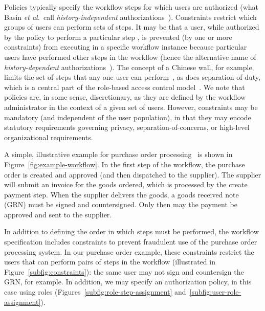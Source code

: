 \documentclass[jcs,crcready]{iosart1c}
\newcommand{\etal}{\textit{et al.}\xspace}
\begin{document}
Policies typically specify the workflow steps for which users are authorized (what Basin \etal\ call \emph{history-independent} authorizations~\cite{BaBuKa12}).
Constraints restrict which groups of users can perform sets of steps.
It may be that a user, while authorized by the policy to perform a particular step , is prevented (by one or more constraints) from executing  in a specific workflow instance because particular users have performed other steps in the workflow (hence the alternative name of \emph{history-dependent} authorizations~\cite{BaBuKa12}).
The concept of a Chinese wall, for example, limits the set of steps that any one user can perform~\cite{BrNa89}, as does separation-of-duty, which is a central part of the role-based access control model~\cite{ansi-rbac04}.
We note that policies are, in some sense, discretionary, as they are defined by the workflow administrator in the context of a given set of users.
However, constraints may be mandatory (and independent of the user population), in that they may encode statutory requirements governing privacy, separation-of-concerns, or high-level organizational requirements.


A simple, illustrative example for purchase order processing~\cite{CrGu13} is shown in Figure~\ref{fig:example-workflow}.
In the first step of the workflow, the purchase order is created and approved (and then dispatched to the supplier).
The supplier will submit an invoice for the goods ordered, which is processed by the create payment step.
When the supplier delivers the goods, a goods received note (GRN) must be signed and countersigned.
Only then may the payment be approved and sent to the supplier. 

In addition to defining the order in which steps must be performed, the workflow specification includes constraints to prevent fraudulent use of the purchase order processing system.
In our purchase order example, these constraints restrict the users that can perform pairs of steps in the workflow (illustrated in Figure~\ref{subfig:constraints}): the same user may not sign and countersign the GRN, for example.
In addition, we may specify an authorization policy, in this case using roles (Figures~\ref{subfig:role-step-assignment} and~\ref{subfig:user-role-assignment}).
\end{document}

